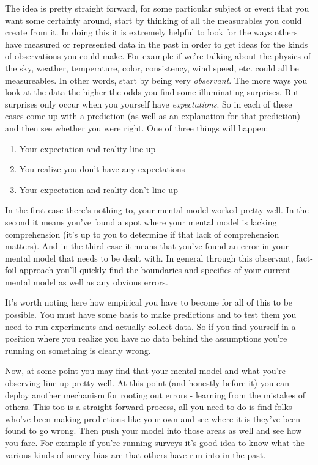 \documentclass[11pt]{book}
\begin{document}
The idea is pretty straight forward, for some particular subject or event that you want some certainty around, start by thinking of all the measurables you could create from it. In doing this it is extremely helpful to look for the ways others have measured or represented data in the past in order to get ideas for the kinds of observations you could make. For example if we're talking about the physics of the sky, weather, temperature, color, consistency, wind speed, etc. could all be measureables. In other words, start by being very \textit{observant}. The more ways you look at the data the higher the odds you find some illuminating surprises. But surprises only occur when you yourself have \textit{expectations}. So in each of these cases come up with a prediction (as well as an explanation for that prediction) and then see whether you were right. One of three things will happen:

\begin{enumerate}
\item Your expectation and reality line up
\item You realize you don't have any expectations
\item Your expectation and reality don't line up
\end{enumerate} 

In the first case there's nothing to, your mental model worked pretty well. In the second it means you've found a spot where your mental model is lacking comprehension (it's up to you to determine if that lack of comprehension matters). And in the third case it means that you've found an error in your mental model that needs to be dealt with. In general through this observant, fact-foil \cite{lipton} approach you'll quickly find the boundaries and specifics of your current mental model as well as any obvious errors.
\newline 

It's worth noting here how empirical you have to become for all of this to be possible. You must have some basis to make predictions and to test them you need to run experiments and actually collect data. So if you find yourself in a position where you realize you have no data behind the assumptions you're running on something is clearly wrong.
\newline

Now, at some point you may find that your mental model and what you're observing line up pretty well. At this point (and honestly before it) you can deploy another mechanism for rooting out errors - learning from the mistakes of others. This too is a straight forward process, all you need to do is find folks who've been making predictions like your own and see where it is they've been found to go wrong. Then push your model into those areas as well and see how you fare. For example if you're running surveys it's good idea to know what the various kinds of survey bias are that others have run into in the past.  
\newline
\end{document}
